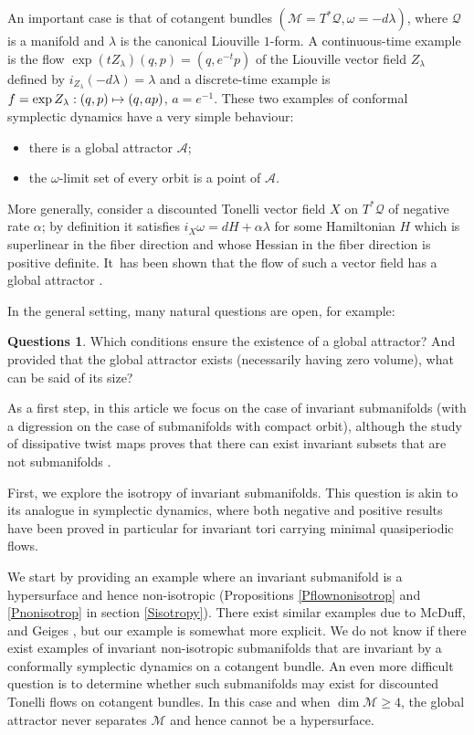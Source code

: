 \documentclass[JEP,XML,SOM,Unicode,published]{cedram}
\def\mto{\mathchoice{\longmapsto}{\mapsto}{\mapsto}{\mapsto}}
\theoremstyle{definition}
\newtheorem*{questions*}{Questions}
\def\cA{{\mathcal A}}
\def\cM{{\mathcal M}}
\def\cQ{{\mathcal Q}}
\begin{document}
An important case is that of cotangent bundles $(\cM = T^*\cQ, \omega=-d\lambda)$, where $\cQ$ is a manifold and $\lambda$ is the canonical Liouville $1$-form. A continuous-time example is the flow $\exp(tZ_\lambda)(q, p)=(q, e^{-t}p)$ of the Liouville vector field $Z_\lambda$ defined by $i_{Z_\lambda}(-d\lambda)=\lambda$ and
a discrete-time example is $f = \exp Z_\lambda: (q, p) \mto (q, a p)$, $a=e^{-1}$. These two examples of conformal symplectic dynamics have a very simple behaviour:
\begin{itemize}
\item there is a global attractor $\cA$;
\item the $\omega$-limit set of every orbit is a point of $\cA$.
\end{itemize}
More generally, consider a discounted Tonelli vector field $X$ on $T^*\cQ$ of negative rate $\alpha$; by definition it satisfies $i_X\omega = dH + \alpha \lambda$ for some Hamiltonian $H$ which is superlinear in the fiber direction and whose Hessian in the fiber direction is positive definite. It~has been shown that the flow of such a vector field has a global attractor \cite{MarSor2017}.

In the general setting, many natural questions are open, for example:

\begin{questions*}
Which conditions ensure the existence of a global attractor? And provided that the global attractor exists (necessarily having zero volume), what can be said of its size?
\end{questions*}

As a first step, in this article we focus on the case of invariant submanifolds (with a digression on the case of submanifolds with compact orbit), although the study of dissipative twist maps proves that there can exist invariant subsets that are not submanifolds \cite{LeCalvez1988}.

First, we explore the isotropy of invariant submanifolds. This question is akin to its analogue in symplectic dynamics, where both negative and positive results have been proved in particular for invariant tori carrying minimal quasiperiodic flows.

We start by providing an example where an invariant submanifold is a hypersurface and hence non-isotropic (Propositions \ref{Pflownonisotrop} and \ref{Pnonisotrop} in section \ref{Sisotropy}). There exist similar examples due to McDuff, \cite{McDuff1991} and Geiges \cite{Geiges1994,Geiges1995}, but our example is somewhat more explicit. We do not know if there exist examples of invariant non-isotropic submanifolds that are invariant by a conformally symplectic dynamics on a cotangent bundle. An even more difficult question is to determine whether such submanifolds may exist for discounted Tonelli flows on cotangent bundles. In this case and when $\dim \cM\geq 4$, the global attractor never separates $\cM$ and hence cannot be a hypersurface.
\end{document}
